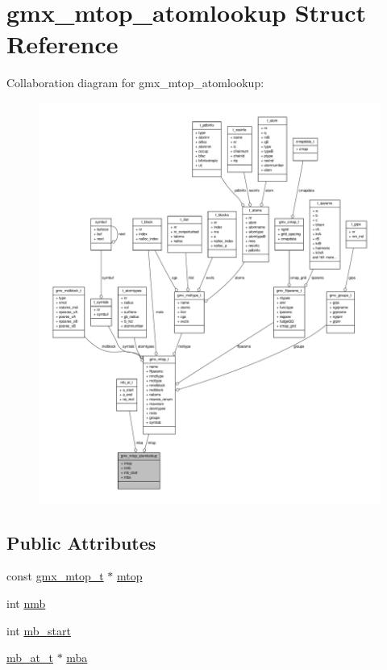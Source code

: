 \hypertarget{structgmx__mtop__atomlookup}{\section{gmx\-\_\-mtop\-\_\-atomlookup \-Struct \-Reference}
\label{structgmx__mtop__atomlookup}
}


\-Collaboration diagram for gmx\-\_\-mtop\-\_\-atomlookup\-:
\nopagebreak
\begin{figure}[H]
\begin{center}
\leavevmode
\includegraphics[width=350pt]{structgmx__mtop__atomlookup__coll__graph}
\end{center}
\end{figure}
\subsection*{\-Public \-Attributes}
\begin{DoxyCompactItemize}
\item 
const \hyperlink{structgmx__mtop__t}{gmx\-\_\-mtop\-\_\-t} $\ast$ \hyperlink{structgmx__mtop__atomlookup_a5ca62ed925e1f7425edc45099be07be9}{mtop}
\item 
int \hyperlink{structgmx__mtop__atomlookup_a1b041a74baf95667e0fd31dc9820fe26}{nmb}
\item 
int \hyperlink{structgmx__mtop__atomlookup_a93388f33d14b29434d2a8cdd8904bda7}{mb\-\_\-start}
\item 
\hyperlink{structmb__at__t}{mb\-\_\-at\-\_\-t} $\ast$ \hyperlink{structgmx__mtop__atomlookup_a51f156cccac868eff5d8cd35d7548e7b}{mba}
\end{DoxyCompactItemize}


